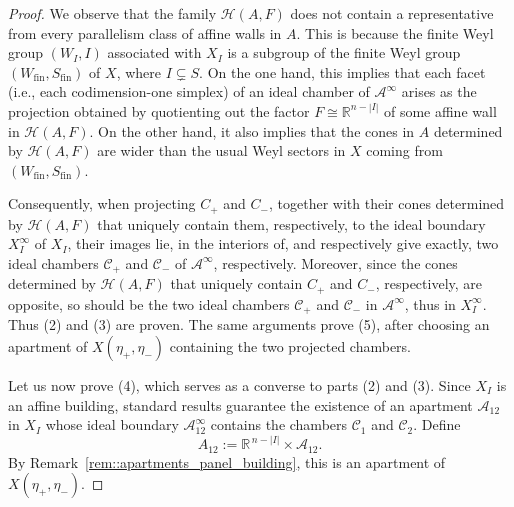 \documentclass[11pt]{amsart}
\newcommand{\Ch}{\mathrm{ch}}
\theoremstyle{plain}
\theoremstyle{definition}
\theoremstyle{remark}
\begin{document}
\begin{proof}
		We observe that the family \(\mathcal{H}(A,F)\) does not contain a representative from every parallelism class of affine walls in \(A\). This is because the finite Weyl group \((W_I, I)\) associated with \(X_I\) is a subgroup of the finite Weyl group \((W_{\mathrm{fin}}, S_{\mathrm{fin}})\) of \(X\), where \(I \subsetneq S\). On the one hand, this implies that each facet (i.e., each codimension-one simplex) of an ideal chamber of \(\mathcal{A}^{\infty}\) arises as the projection obtained by quotienting out the factor \(F \cong \mathbb{R}^{n - |I|}\) of some affine wall in \(\mathcal{H}(A,F)\). On the other hand, it also implies that the cones in \(A\) determined by \(\mathcal{H}(A,F)\) are wider than the usual Weyl sectors in \(X\) coming from $(W_{\mathrm{fin}}, S_{\mathrm{fin}})$.  
		
		Consequently, when projecting \(C_{+}\) and \(C_{-}\), together with their cones determined by \(\mathcal{H}(A,F)\) that uniquely contain them, respectively, to the ideal boundary \(X_I^{\infty}\) of \(X_I\), their images lie, in the interiors of, and respectively give exactly, two ideal chambers \(\mathcal{C}_{+}\) and \(\mathcal{C}_{-}\) of \(\mathcal{A}^{\infty}\), respectively. Moreover, since the cones determined by \(\mathcal{H}(A,F)\) that uniquely contain \(C_{+}\) and \(C_{-}\), respectively, are opposite, so should be the two ideal chambers \(\mathcal{C}_{+}\) and \(\mathcal{C}_{-}\) in \(\mathcal{A}^{\infty}\), thus in $X_I^{\infty}$. Thus (2) and (3) are proven. The same arguments prove (5), after choosing an apartment of $X(\eta_+,\eta_-)$ containing the two projected chambers.

		
		Let us now prove (4), which serves as a converse to parts (2) and (3).  
		Since $X_{I}$ is an affine building, standard results guarantee the existence of an apartment $\mathcal{A}_{12}$ in $X_{I}$ whose ideal boundary $\mathcal{A}_{12}^{\infty}$ contains the chambers $\mathcal{C}_{1}$ and $\mathcal{C}_{2}$.  
		Define
		\[
		A_{12} := \mathbb{R}^{\,n - |I|} \times \mathcal{A}_{12}.
		\]
		By Remark~\ref{rem::apartments_panel_building}, this is an apartment of 
		$X(\eta_{+},\eta_{-})$.
		

\end{proof}
\end{document}
